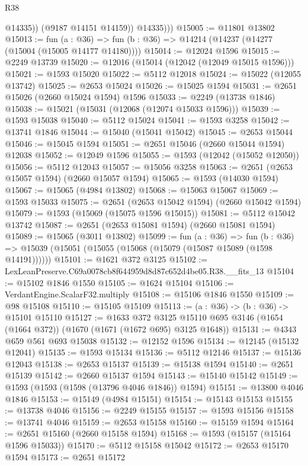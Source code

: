 \begin{lexlean}{R38}
\begin{coremodule}
                @14335))
            (@9187 @14151 @14159))
          @14335)))
@15005 := @11801 @13802
@15013 := fun (a : @36) => fun (b : @36) => @14214 (@14237 (@14277 (@15004 (@15005 @14177 @14180))))
@15014 := @12024 @1596
@15015 := @2249 @13739
@15020 := @12016 (@15014 (@12042 (@12049 @15015 @1596)))
@15021 := @1593 @15020
@15022 := @5112 @12018
@15024 := @15022 (@12055 @13742)
@15025 := @2653 @15024
@15026 := @15025 @1594
@15031 := @2651 @15026 (@2660 @15024 @1594) @1596
@15033 := @2249 (@13738 @1846)
@15038 := @15021 (@15031 (@12068 (@12074 @15033 @1596)))
@15039 := @1593 @15038
@15040 := @5112 @15024
@15041 := @1593 @3258
@15042 := @13741 @1846
@15044 := @15040 (@15041 @15042)
@15045 := @2653 @15044
@15046 := @15045 @1594
@15051 := @2651 @15046 (@2660 @15044 @1594) @12038
@15052 := @12049 @1596
@15055 := @1593 (@12042 (@15052 @12050))
@15056 := @5112 @12043
@15057 := @15056 @3258
@15063 := @2651 (@2653 @15057 @1594) (@2660 @15057 @1594)
@15065 := @1593 (@14030 @1594)
@15067 := @15065 (@4984 @13802)
@15068 := @15063 @15067
@15069 := @1593 @15033
@15075 := @2651 (@2653 @15042 @1594) (@2660 @15042 @1594)
@15079 := @1593 (@15069 (@15075 @1596 @15015))
@15081 := @5112 @15042 @13742
@15087 := @2651 (@2653 @15081 @1594) (@2660 @15081 @1594)
@15089 := @15065 (@3011 @13802)
@15099 := fun (a : @36) =>
  fun (b : @36) => @15039 (@15051 (@15055 (@15068 (@15079 (@15087 @15089 (@1598 @14191))))))
@15101 := @1621 @372 @3125
@15102 := LexLeanPreserve.C69a0078cb8f644959d8d87c652d4be05.R38.__fits_13
@15104 := @15102 @1846 @1550
@15105 := @1624 @15104
@15106 := VerdantEngine.ScalarF32.multiply
@15108 := @15106 @1846 @1550
@15109 := @98 @15108
@15110 := @15105 @15109
@15113 := (a : @36) -> (b : @36) -> @15101 @15110
@15127 := @1633
    @372
    @3125
    @15110
    @695
    @3146
    (@1654 (@1664 @372))
    (@1670 (@1671 (@1672 @695) @3125 @1648))
@15131 := @4343 @659 @561 @693 @15038
@15132 := @12152 @1596
@15134 := @12145 (@15132 @12041)
@15135 := @1593 @15134
@15136 := @5112 @12146
@15137 := @15136 @12043
@15138 := @2653 @15137
@15139 := @15138 @1594
@15140 := @2651 @15139
@15142 := @2660 @15137 @1594
@15143 := @15140 @15142
@15149 := @1593 (@1593 (@1598 (@13796 @4046 @1846)) @1594)
@15151 := @13800 @4046 @1846
@15153 := @15149 (@4984 @15151)
@15154 := @15143 @15153
@15155 := @13738 @4046
@15156 := @2249 @15155
@15157 := @1593 @15156
@15158 := @13741 @4046
@15159 := @2653 @15158
@15160 := @15159 @1594
@15164 := @2651 @15160 (@2660 @15158 @1594)
@15168 := @1593 (@15157 (@15164 @1596 @15033))
@15170 := @5112 @15158 @15042
@15172 := @2653 @15170 @1594
@15173 := @2651 @15172

\end{coremodule}
\end{lexlean}
